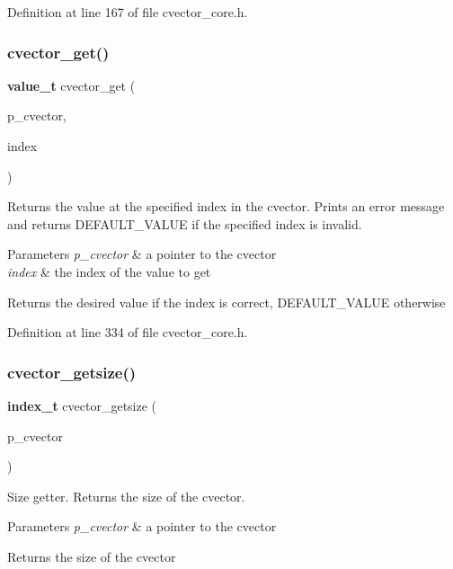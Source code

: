 Definition at line 167 of file cvector\+\_\+core.\+h.

\mbox{\label{cvector__core_8h_af9a92765b9a85699a7acba0c51ac8620}} 
\subsubsection{cvector\+\_\+get()}
{\footnotesize\ttfamily \textbf{ value\+\_\+t} cvector\+\_\+get (\begin{DoxyParamCaption}\item[{\textbf{ cvector} $\ast$}]{p\+\_\+cvector,  }\item[{\textbf{ index\+\_\+t}}]{index }\end{DoxyParamCaption})}

Returns the value at the specified index in the cvector. Prints an error message and returns D\+E\+F\+A\+U\+L\+T\+\_\+\+V\+A\+L\+UE if the specified index is invalid. 
\begin{DoxyParams}{Parameters}
{\em p\+\_\+cvector} & a pointer to the cvector \\
\hline
{\em index} & the index of the value to get \\
\hline
\end{DoxyParams}
\begin{DoxyReturn}{Returns}
the desired value if the index is correct, D\+E\+F\+A\+U\+L\+T\+\_\+\+V\+A\+L\+UE otherwise 
\end{DoxyReturn}


Definition at line 334 of file cvector\+\_\+core.\+h.

\mbox{\label{cvector__core_8h_a069c279e9bce4acc6a357862b100ead7}} 
\subsubsection{cvector\+\_\+getsize()}
{\footnotesize\ttfamily \textbf{ index\+\_\+t} cvector\+\_\+getsize (\begin{DoxyParamCaption}\item[{\textbf{ cvector} $\ast$}]{p\+\_\+cvector }\end{DoxyParamCaption})}

Size getter. Returns the size of the cvector. 
\begin{DoxyParams}{Parameters}
{\em p\+\_\+cvector} & a pointer to the cvector \\
\hline
\end{DoxyParams}
\begin{DoxyReturn}{Returns}
the size of the cvector 
\end{DoxyReturn}


